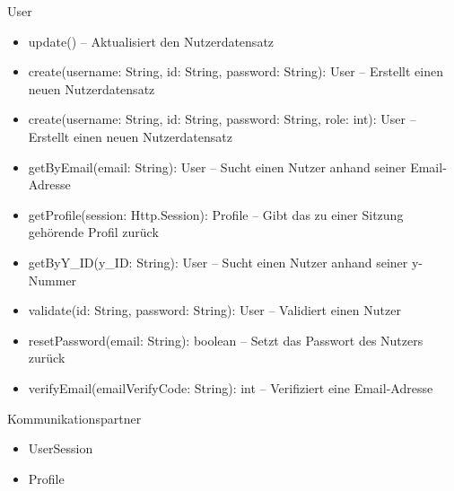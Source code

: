 \begin{class}{80}{User}
\begin{itemize}
\item update() -- Aktualisiert den Nutzerdatensatz
\item create(username: String, id: String, password: String): User -- Erstellt einen neuen Nutzerdatensatz
\item create(username: String, id: String, password: String, role: int): User -- Erstellt einen neuen Nutzerdatensatz
\item getByEmail(email: String): User -- Sucht einen Nutzer anhand seiner Email-Adresse
\item getProfile(session: Http.Session): Profile -- Gibt das zu einer Sitzung gehörende Profil zurück
\item getByY\_ID(y\_ID: String): User -- Sucht einen Nutzer anhand seiner y-Nummer
\item validate(id: String, password: String): User -- Validiert einen Nutzer
\item resetPassword(email: String): boolean -- Setzt das Passwort des Nutzers zurück
\item verifyEmail(emailVerifyCode: String): int -- Verifiziert eine Email-Adresse
\end{itemize}
\item[Kommunikationspartner]~\\
\begin{itemize}
\item UserSession
\item Profile
\end{itemize}
\end{class}


